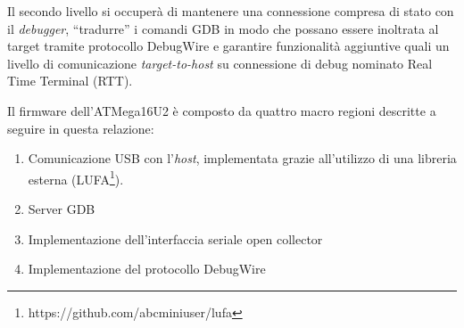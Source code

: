 Il secondo livello si occuperà di mantenere una connessione compresa di stato con il \textit{debugger}, ``tradurre'' i comandi GDB in modo che possano essere inoltrata al target tramite protocollo DebugWire e garantire funzionalità aggiuntive quali un livello di comunicazione \textit{target-to-host} su connessione di debug nominato Real Time Terminal (RTT).

Il firmware dell'ATMega16U2 è composto da quattro macro regioni descritte a seguire in questa relazione:
\begin{enumerate}
    \item Comunicazione USB con l'\textit{host}, implementata grazie all'utilizzo di una libreria esterna (LUFA\footnote{https://github.com/abcminiuser/lufa}).
    \item Server GDB
    \item Implementazione dell'interfaccia seriale open collector
    \item Implementazione del protocollo DebugWire
\end{enumerate}

